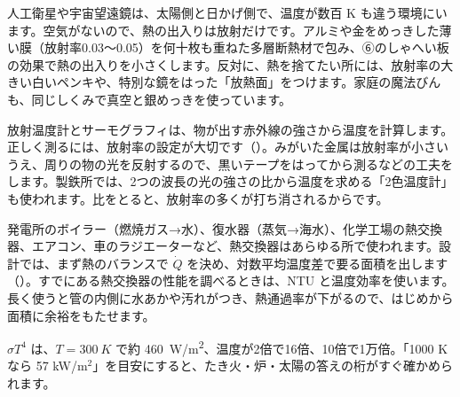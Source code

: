 \begin{phkougaku}
人工衛星や宇宙望遠鏡は、太陽側と日かげ側で、温度が数百 K も違う環境にいます。空気がないので、熱の出入りは放射だけです。アルミや金をめっきした薄い膜（放射率0.03〜0.05）を何十枚も重ねた多層断熱材で包み、⑥のしゃへい板の効果で熱の出入りを小さくします。反対に、熱を捨てたい所には、放射率の大きい白いペンキや、特別な鏡をはった「放熱面」をつけます。家庭の魔法びんも、同じしくみで真空と銀めっきを使っています。

放射温度計とサーモグラフィは、物が出す赤外線の強さから温度を計算します。正しく測るには、放射率の設定が大切です（）。みがいた金属は放射率が小さいうえ、周りの物の光を反射するので、黒いテープをはってから測るなどの工夫をします。製鉄所では、2つの波長の光の強さの比から温度を求める「2色温度計」も使われます。比をとると、放射率の多くが打ち消されるからです。

発電所のボイラー（燃焼ガス→水）、復水器（蒸気→海水）、化学工場の熱交換器、エアコン、車のラジエーターなど、熱交換器はあらゆる所で使われます。設計では、まず熱のバランスで $\dot Q$ を決め、対数平均温度差で要る面積を出します（）。すでにある熱交換器の性能を調べるときは、NTU と温度効率を使います。長く使うと管の内側に水あかや汚れがつき、熱通過率が下がるので、はじめから面積に余裕をもたせます。

\begin{phketa}[放射と熱交換器の数]
$\sigma T^4$ は、$T=\qty{300}{K}$ で約 \qty{460}{W/m^2}、温度が2倍で16倍、10倍で1万倍。「1000 K なら 57 kW/m$^2$」を目安にすると、たき火・炉・太陽の答えの桁がすぐ確かめられます。
\end{phketa}
\end{phkougaku}

